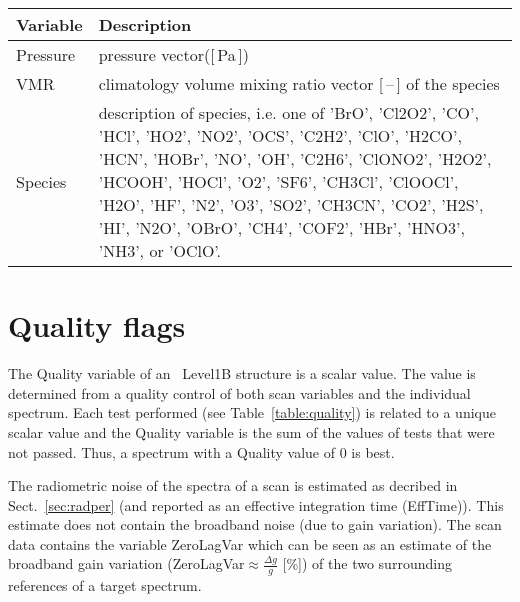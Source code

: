 \begin{table}
\caption{ \smr\ \textit{a priori} data format. 
Example URL: \url{http://malachite.rss.chalmers.se/rest_api/v4/apriori/O3/2015-01-03/AC1/2/7002887494/} }
\label{table:aprioridataformat}
\begin{longtable}{| p{} | p{} |}
\hline
  \textbf{Variable} & \textbf{Description} \\ \hline
    Pressure        & pressure vector([\,Pa\,]) \\ \hline
    VMR             & climatology volume mixing ratio vector [\,--\,] of the species\\ \hline
    Species         & description of species, i.e. one of 'BrO', 'Cl2O2', 'CO', 'HCl', 'HO2', 'NO2',
                      'OCS', 'C2H2', 'ClO', 'H2CO', 'HCN', 'HOBr', 'NO', 'OH', 'C2H6', 'ClONO2', 'H2O2',
                      'HCOOH', 'HOCl', 'O2', 'SF6', 'CH3Cl', 'ClOOCl', 'H2O', 'HF', 'N2', 'O3', 'SO2',
                      'CH3CN', 'CO2', 'H2S', 'HI', 'N2O', 'OBrO', 'CH4', 'COF2', 'HBr', 'HNO3', 'NH3', or 'OClO'.\\ \hline
\hline
\end{longtable}
\end{table}
\addtocounter{table}{-1}


\section{Quality flags}

The Quality variable of an \smr\ Level1B structure is a scalar value.
The value is determined from a quality control
of both scan variables and the individual spectrum.
Each test performed (see Table~\ref{table:quality}) is related to a unique scalar value
and the Quality variable is the sum of the values of tests 
that were not passed.  
Thus, a spectrum with a Quality value of 0 is best.

The radiometric noise of the spectra of a scan is estimated as decribed  
in Sect.~\ref{sec:radper} (and reported as an effective integration time (EffTime)).
This estimate does not contain the broadband noise (due to gain variation). 
The scan data contains the variable ZeroLagVar which can be seen as an estimate
of the broadband gain variation (ZeroLagVar\(\approx \frac{\Delta g}{g}\) [\%]) 
of the two surrounding references of a target spectrum. 
 
